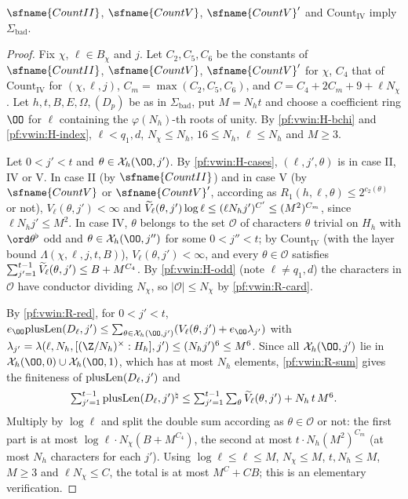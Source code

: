 \begin{proposition}\label{pf:vwin:sumin}
$\sfname{CountII}$, $\sfname{CountV}$, $\sfname{CountV}'$ and $\mathrm{Count}_{\mathrm{IV}}$ imply $\Sigma_{\mathrm{bad}}$.
\end{proposition}

\begin{proof}
Fix $\chi$, $\ell\in B_\chi$ and $j$. Let $C_2,C_5,C_6$ be the constants of $\sfname{CountII}$, $\sfname{CountV}$,
$\sfname{CountV}'$ for $\chi$, $C_4$ that of $\mathrm{Count}_{\mathrm{IV}}$ for $(\chi,\ell,j)$, $C_m=\max(C_2,C_5,C_6)$, and
$C=C_4+2C_m+9+\ell N_\chi$. Let $h,t,B,E,\Omega,(D_p)$ be as in $\Sigma_{\mathrm{bad}}$, put $M=N_ht$ and choose a coefficient ring
$\OO$ for $\ell$ containing the $\varphi(N_h)$-th roots of unity. By \ref{pf:vwin:H-bchi} and \ref{pf:vwin:H-index},
$\ell<q_1,d$, $N_\chi\le N_h$, $16\le N_h$, $\ell\le N_h$ and $M\ge3$.

Let $0<j'<t$ and $\theta\in\vwinX_h(\OO,j')$. By \ref{pf:vwin:H-cases}, $(\ell,j',\theta)$ is in case II, IV or V. In case II
(by $\sfname{CountII}$) and in case V (by $\sfname{CountV}$ or $\sfname{CountV}'$, according as $R_1(h,\ell,\theta)\le2^{c_2(\theta)}$
or not), $V_\ell(\theta,j')<\infty$ and $\widetilde V_\ell(\theta,j')\log\ell\le(\ell N_hj')^{C'}\le(M^2)^{C_m}$, since $\ell N_hj'\le M^2$.
In case IV, $\theta$ belongs to the set $\mathcal O$ of characters $\theta$ trivial on $H_h$ with $\ord\theta^\flat$ odd and
$\theta\in\vwinX_h(\OO,j'')$ for some $0<j''<t$; by $\mathrm{Count}_{\mathrm{IV}}$ (with the layer bound
$\Lambda(\chi,\ell,j,t,B)$), $V_\ell(\theta,j')<\infty$, and every $\theta\in\mathcal O$ satisfies
$\sum_{j'=1}^{t-1}\widetilde V_\ell(\theta,j')\le B+M^{C_4}$. By \ref{pf:vwin:H-odd} (note $\ell\ne q_1,d$) the characters in
$\mathcal O$ have conductor dividing $N_\chi$, so $|\mathcal O|\le N_\chi$ by \ref{pf:vwin:R-card}.

By \ref{pf:vwin:R-red}, for $0<j'<t$,
$e_\OO\vwinplus(D_\ell,j')\le\sum_{\theta\in\vwinX_h(\OO,j')}(V_\ell(\theta,j')+e_\OO\lambda_{j'})$ with
$\lambda_{j'}=\lambda(\ell,N_h,[(\Z/N_h)^\times:H_h],j')\le(N_hj')^6\le M^6$. Since all $\vwinX_h(\OO,j')$ lie in
$\vwinX_h(\OO,0)\cup\vwinX_h(\OO,1)$, which has at most $N_h$ elements, \ref{pf:vwin:R-sum} gives the finiteness of
$\mathrm{plusLen}(D_\ell,j')$ and
\[
\textstyle\sum_{j'=1}^{t-1}\mathrm{plusLen}(D_\ell,j')^\natural\le\sum_{j'=1}^{t-1}\sum_{\theta}\widetilde V_\ell(\theta,j')+N_h\,t\,M^6 .
\]
Multiply by $\log\ell$ and split the double sum according as $\theta\in\mathcal O$ or not: the first part is at most
$\log\ell\cdot N_\chi(B+M^{C_4})$, the second at most $t\cdot N_h(M^2)^{C_m}$ (at most $N_h$ characters for each $j'$). Using
$\log\ell\le\ell\le M$, $N_\chi\le M$, $t,N_h\le M$, $M\ge3$ and $\ell N_\chi\le C$, the total is at most $M^C+CB$; this is an
elementary verification.
\end{proof}

